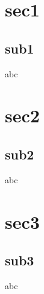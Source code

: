 \documentclass{beamer}
\begin{document}
\section{sec1}
\subsection{sub1}   
\begin{frame}
    abc
\end{frame} 

\section{sec2}
\subsection{sub2}   
\begin{frame}
    abc
\end{frame} 

\section{sec3}
\subsection{sub3}   
\begin{frame}
    abc
\end{frame}
\end{document}
